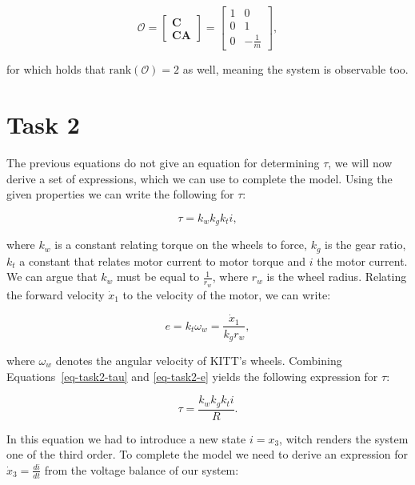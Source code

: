 \documentclass[11pt,titlepage]{report}
\begin{document}
\begin{equation}
    \mathcal{O} = 
    \begin{bmatrix}
      \mathbf{C} \\
      \mathbf{CA}
    \end{bmatrix} = 
    \begin{bmatrix}
        1 & 0 \\
        0 & 1 \\
        0 & -\frac{1}{m}
    \end{bmatrix},
\end{equation}

for which holds that $\mathrm{rank}(\mathcal{O}) = 2$ as well, meaning the system is observable too.

\section{Task 2}
The previous equations do not give an equation for determining $\tau$, we will now derive a set of expressions, which we can use to complete the model. Using the given properties we can write the following for $\tau$:

\begin{equation}\label{eq-task2-tau}
    \tau = k_w k_g k_t i,
\end{equation}

where $k_w$ is a constant relating torque on the wheels to force, $k_g$ is the gear ratio, $k_t$ a constant that relates motor current to motor torque and $i$ the motor current. We can argue that $k_w$ must be equal to $\frac{1}{r_w}$, where $r_w$ is the wheel radius. Relating the forward velocity $\dot{x}_1$ to the velocity of the motor, we can write:

\begin{equation}\label{eq-task2-e}
    e = k_t \omega_w = \frac{\dot{x}_1}{k_g r_w},
\end{equation}

where $\omega_w$ denotes the angular velocity of KITT's wheels. Combining Equations~\ref{eq-task2-tau} and \ref{eq-task2-e} yields the following expression for $\tau$:

\begin{equation}  
    \tau = \frac{k_w k_g k_t i}{R}.
\end{equation}

In this equation we had to introduce a new state $i = x_3$, witch renders the system one of the third order. To complete the model we need to derive an expression for $\dot{x}_3 = \frac{di}{dt}$ from the voltage balance of our system:
\end{document}
